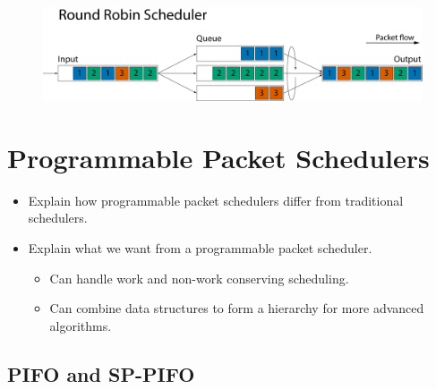 \documentclass[sigconf, nonacm]{acmart}
\begin{document}
\begin{figure}
  \includegraphics[width=\linewidth]{round-robin.pdf}
  \caption{\label{fig:round_robin}}
\end{figure}


\section{Programmable Packet Schedulers}


\begin{itemize}
  \item Explain how programmable packet schedulers differ from traditional schedulers.
  \item Explain what we want from a programmable packet scheduler.
        \begin{itemize}
          \item Can handle work and non-work conserving scheduling.
          \item Can combine data structures to form a hierarchy for more advanced algorithms.
        \end{itemize}
\end{itemize}



\subsection{PIFO and SP-PIFO}

%
\end{document}
